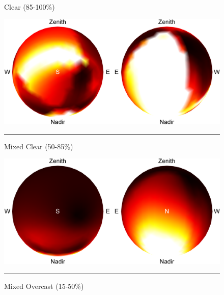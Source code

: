 \begin{figure}[t]
    \centering
    \begin{minipage}{.5\linewidth}
    \begin{sideways}\begin{minipage}{.4\linewidth}\centering \scriptsize Clear (85-100\%)\vspace{5pt} \end{minipage}\end{sideways}
    \includegraphics[width=.9\linewidth]{./figures/confidenceIntervals/clear-mean_10pm.png} \\
    \vspace{.4em} \noindent\rule{\linewidth}{0.1pt} \vspace{-.8em}
    \begin{sideways}\begin{minipage}{.4\linewidth}\centering \scriptsize Mixed Clear (50-85\%)\vspace{5pt} \end{minipage}\end{sideways}
    \includegraphics[width=.9\linewidth]{./figures/confidenceIntervals/mixed-clear-mean_10pm.png} \\
    \vspace{.4em} \noindent\rule{\linewidth}{0.1pt} \vspace{-.8em}
    \begin{sideways}\begin{minipage}{.4\linewidth}\centering \scriptsize Mixed Overcast (15-50\%)\vspace{5pt} \end{minipage}\end{sideways}

\end{minipage}
\end{figure}
